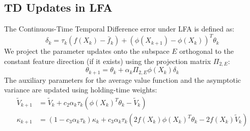 \documentclass[11pt]{article}
\begin{document}
\subsection{TD Updates in LFA}
The Continuous-Time Temporal Difference error under LFA is defined as:
\begin{equation}
    \delta_k = \tau_k (f(X_k) - \bar{f}_k) + (\phi(X_{k+1}) - \phi(X_k))^T \theta_k
\end{equation}
We project the parameter updates onto the subspace $E$ orthogonal to the constant feature direction (if it exists) using the projection matrix $\Pi_{2,E}$:
\begin{equation}
    \theta_{k+1} = \theta_k + \alpha_k \Pi_{2,E} \phi(X_k) \delta_k
\end{equation}
The auxiliary parameters for the average value function and the asymptotic variance are updated using holding-time weights:
\begin{align}
    \tilde{V}_{k+1} &= \tilde{V}_k + c_2 \alpha_k \tau_k (\phi(X_k)^T \theta_k - \tilde{V}_k) \\
    \kappa_{k+1} &= (1 - c_3 \alpha_k \tau_k) \kappa_k + c_3 \alpha_k \tau_k \left( 2f(X_k)\phi(X_k)^T \theta_k - 2f(X_k)\tilde{V}_k \right)
\end{align}
\end{document}
